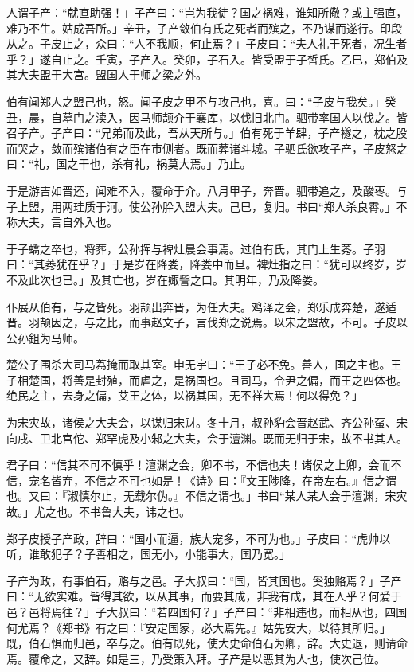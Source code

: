 \documentclass[]{article}
\begin{document}
人谓子产：``就直助强！」子产曰：``岂为我徒？国之祸难，谁知所儆？或主强直，难乃不生。姑成吾所。」辛丑，子产敛伯有氏之死者而殡之，不乃谋而遂行。印段从之。子皮止之，众曰：``人不我顺，何止焉？」子皮曰：``夫人礼于死者，况生者乎？」遂自止之。壬寅，子产入。癸卯，子石入。皆受盟于子皙氏。乙巳，郑伯及其大夫盟于大宫。盟国人于师之梁之外。

伯有闻郑人之盟己也，怒。闻子皮之甲不与攻己也，喜。曰：``子皮与我矣。」癸丑，晨，自墓门之渎入，因马师颉介于襄库，以伐旧北门。驷带率国人以伐之。皆召子产。子产曰：``兄弟而及此，吾从天所与。」伯有死于羊肆，子产襚之，枕之股而哭之，敛而殡诸伯有之臣在市侧者。既而葬诸斗城。子驷氏欲攻子产，子皮怒之曰：``礼，国之干也，杀有礼，祸莫大焉。」乃止。

于是游吉如晋还，闻难不入，覆命于介。八月甲子，奔晋。驷带追之，及酸枣。与子上盟，用两珪质于河。使公孙肸入盟大夫。己巳，复归。书曰``郑人杀良霄。」不称大夫，言自外入也。

于子蟜之卒也，将葬，公孙挥与裨灶晨会事焉。过伯有氏，其门上生莠。子羽曰：``其莠犹在乎？」于是岁在降娄，降娄中而旦。裨灶指之曰：``犹可以终岁，岁不及此次也已。」及其亡也，岁在娵訾之口。其明年，乃及降娄。

仆展从伯有，与之皆死。羽颉出奔晋，为任大夫。鸡泽之会，郑乐成奔楚，遂适晋。羽颉因之，与之比，而事赵文子，言伐郑之说焉。以宋之盟故，不可。子皮以公孙鉏为马师。

楚公子围杀大司马蒍掩而取其室。申无宇曰：``王子必不免。善人，国之主也。王子相楚国，将善是封殖，而虐之，是祸国也。且司马，令尹之偏，而王之四体也。绝民之主，去身之偏，艾王之体，以祸其国，无不祥大焉！何以得免？」

为宋灾故，诸侯之大夫会，以谋归宋财。冬十月，叔孙豹会晋赵武、齐公孙虿、宋向戌、卫北宫佗、郑罕虎及小邾之大夫，会于澶渊。既而无归于宋，故不书其人。

君子曰：``信其不可不慎乎！澶渊之会，卿不书，不信也夫！诸侯之上卿，会而不信，宠名皆弃，不信之不可也如是！《诗》曰：『文王陟降，在帝左右。』信之谓也。又曰：『淑慎尔止，无载尔伪。』不信之谓也。」书曰``某人某人会于澶渊，宋灾故。」尤之也。不书鲁大夫，讳之也。

郑子皮授子产政，辞曰：``国小而逼，族大宠多，不可为也。」子皮曰：``虎帅以听，谁敢犯子？子善相之，国无小，小能事大，国乃宽。」

子产为政，有事伯石，赂与之邑。子大叔曰：``国，皆其国也。奚独赂焉？」子产曰：``无欲实难。皆得其欲，以从其事，而要其成，非我有成，其在人乎？何爱于邑？邑将焉往？」子大叔曰：``若四国何？」子产曰：``非相违也，而相从也，四国何尤焉？《郑书》有之曰：『安定国家，必大焉先。』姑先安大，以待其所归。」既，伯石惧而归邑，卒与之。伯有既死，使大史命伯石为卿，辞。大史退，则请命焉。覆命之，又辞。如是三，乃受策入拜。子产是以恶其为人也，使次己位。
\end{document}
